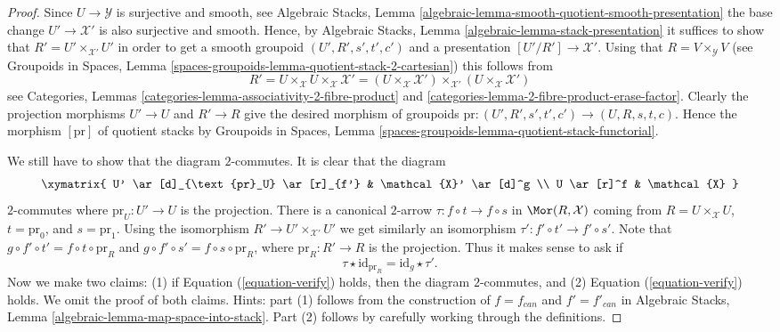 \begin{proof}
Since $U \to \mathcal{Y}$ is surjective and smooth, see
Algebraic Stacks,
Lemma \ref{algebraic-lemma-smooth-quotient-smooth-presentation}
the base change $U' \to \mathcal{X}'$ is also surjective and smooth.
Hence, by
Algebraic Stacks,
Lemma \ref{algebraic-lemma-stack-presentation}
it suffices to show that $R' = U' \times_{\mathcal{X}'} U'$ in order to
get a smooth groupoid $(U', R', s', t', c')$ and a presentation
$[U'/R'] \to \mathcal{X}'$.
Using that $R = V \times_\mathcal{Y} V$ (see
Groupoids in Spaces,
Lemma \ref{spaces-groupoids-lemma-quotient-stack-2-cartesian})
this follows from
$$
R' =
U \times_\mathcal{X} U \times_\mathcal{X} \mathcal{X}' =
(U \times_\mathcal{X} \mathcal{X}')
\times_{\mathcal{X}'}
(U \times_\mathcal{X} \mathcal{X}')
$$
see
Categories, Lemmas \ref{categories-lemma-associativity-2-fibre-product} and
\ref{categories-lemma-2-fibre-product-erase-factor}.
Clearly the projection morphisms $U' \to U$ and $R' \to R$ give the
desired morphism of groupoids
$\text{pr} : (U', R', s', t', c') \to (U, R, s, t, c)$.
Hence the morphism $[\text{pr}]$ of quotient stacks by
Groupoids in Spaces,
Lemma \ref{spaces-groupoids-lemma-quotient-stack-functorial}.

\medskip\noindent
We still have to show that the diagram $2$-commutes.
It is clear that the diagram
$$
\xymatrix{
U' \ar[d]_{\text{pr}_U} \ar[r]_{f'} & \mathcal{X}' \ar[d]^g \\
U \ar[r]^f & \mathcal{X}
}
$$
$2$-commutes where $\text{pr}_U : U' \to U$ is the projection.
There is a canonical $2$-arrow
$\tau : f \circ t \to f \circ s$ in $\Mor(R, \mathcal{X})$
coming from $R = U \times_\mathcal{X} U$, $t = \text{pr}_0$, and
$s = \text{pr}_1$. Using the isomorphism
$R' \to U' \times_{\mathcal{X}'} U'$ we get similarly an isomorphism
$\tau' : f' \circ t' \to f' \circ s'$. Note that
$g \circ f' \circ t' = f \circ t \circ \text{pr}_R$ and
$g \circ f' \circ s' = f \circ s \circ \text{pr}_R$, where
$\text{pr}_R : R' \to R$ is the projection. Thus it makes sense to ask
if
\begin{equation}
\label{equation-verify}
\tau \star \text{id}_{\text{pr}_R} = \text{id}_g \star \tau'.
\end{equation}
Now we make two claims: (1) if Equation (\ref{equation-verify}) holds,
then the diagram $2$-commutes, and (2) Equation (\ref{equation-verify}) holds.
We omit the proof of both claims. Hints: part (1) follows from the
construction of $f = f_{can}$ and $f' = f'_{can}$ in
Algebraic Stacks, Lemma \ref{algebraic-lemma-map-space-into-stack}.
Part (2) follows by carefully working through the definitions.
\end{proof}

